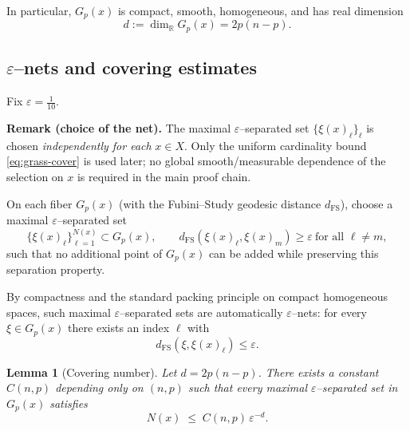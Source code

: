 \documentclass[11pt]{article}
\newcommand{\REVMZ}[1]{\textcolor{teal}{#1}}  %
\numberwithin{equation}{section}  %
\theoremstyle{plain}
\newtheorem{lemma}[theorem]{Lemma}
\theoremstyle{definition}
\theoremstyle{remark}
\newcommand{\R}{\mathbb{R}}
\begin{document}
In particular, $G_{p}(x)$ is
compact, smooth, homogeneous, and has real dimension
\[
d := \dim_{\R} G_{p}(x)
= 2p(n-p).
\]

\subsection{$\varepsilon$--nets and covering estimates}\label{sec:epsnets}

Fix $\varepsilon = \tfrac{1}{10}$.  


\smallskip\noindent\textbf{Remark (choice of the net).}
The maximal $\varepsilon$--separated set $\{\xi(x)_{\ell}\}_{\ell}$ is chosen \emph{independently for each} $x\in X$.
Only the uniform cardinality bound \eqref{eq:grass-cover} is used later; no global smooth/measurable dependence of the selection on $x$
is required in the main proof chain.



On each fiber $G_{p}(x)$ (with the Fubini--Study geodesic distance
$d_{\mathrm{FS}}$), choose a maximal $\varepsilon$--separated set
\[
\{\xi(x)_\ell\}_{\ell=1}^{N(x)}
\subset G_{p}(x),
\qquad
d_{\mathrm{FS}}(\xi(x)_\ell,\xi(x)_m) \ge \varepsilon
\ \text{for all }\ell\ne m,
\]
such that no additional point of $G_{p}(x)$ can be added while preserving
this separation property.

By compactness and the standard packing principle \REVMZ{\cite{GH78}} on compact homogeneous
spaces, such maximal $\varepsilon$--separated sets are automatically
$\varepsilon$--nets: for every $\xi \in G_{p}(x)$ there exists an index
$\ell$ with  
\[
d_{\mathrm{FS}}(\xi,\xi(x)_\ell) \le \varepsilon.
\]

\begin{lemma}[Covering number]\label{lem:covering-number}
	Let $d = 2p(n-p)$.  
	There exists a constant $C(n,p)$ depending only on $(n,p)$ such that every
	maximal $\varepsilon$--separated set in $G_{p}(x)$ satisfies
	\begin{equation}\label{eq:grass-cover}
		N(x) \;\le\; C(n,p)\,\varepsilon^{-d}.
		\tag{5.1}
	\end{equation}
\end{lemma}
\end{document}
